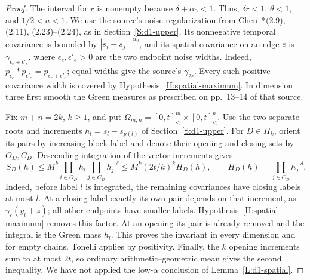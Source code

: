 \documentclass[12pt]{article}
\numberwithin{equation}{section}
\theoremstyle{definition}
\begin{document}
\begin{proof}
  The interval for $r$ is nonempty because $\delta+\alpha_0<1$.
  Thus, $\delta r<1$, $\theta<1$, and $1/2<a<1$.
  We use the source's noise regularization from
  Chen~\cite{chen:author2026:time-dependency}*{(2.9), (2.11),
  (2.23)--(2.24)}, as in Section~\ref{S:d1-upper}. Its nonnegative
  temporal covariance is bounded by $|s_i-s_j|^{-\alpha_0}$, and its
  spatial covariance on an edge $e$ is
  $\gamma_{\epsilon_e+\epsilon'_e}$, where $\epsilon_e,\epsilon'_e>0$
  are the two endpoint noise widths. Indeed,
  $p_{\epsilon_e}*p_{\epsilon'_e}=p_{\epsilon_e+\epsilon'_e}$;
  equal widths give the source's $\gamma_{2\epsilon}$.
  Every such positive covariance width is covered by
  Hypothesis~\ref{H:spatial-maximum}. In dimension three first smooth
  the Green measures as prescribed on pp.~13--14 of that source.

  Fix $m+n=2k$, $k\ge1$, and put
  $\Omega_{m,n}=[0,t]^m_<\times[0,t]^n_<$.
  Use the two separate roots and increments $h_l=s_l-s_{p(l)}$ of
  Section~\ref{S:d1-upper}. For $D\in\Pi_k$, orient its pairs by
  increasing block label and denote their opening and closing sets by
  $O_D,C_D$. Descending integration of the vector increments gives
  \[
    S_D(h)\le M^k\prod_{i\in O_D}h_i\prod_{j\in C_D}h_j^{-\delta}
    \le M^k(2t/k)^k H_D(h),\qquad
    H_D(h)=\prod_{j\in C_D}h_j^{-\delta}.
  \]
  Indeed, before label $l$ is integrated, the remaining covariances have
  closing labels at most $l$. At a closing label exactly its own pair
  depends on that increment, as $\gamma_\epsilon(y_l+z)$; all other
  endpoints have smaller labels. Hypothesis~\ref{H:spatial-maximum}
  removes this factor. At an opening its pair is already removed and
  the integral is the Green mass $h_l$. This proves the invariant in
  every dimension and for empty chains. Tonelli applies by positivity.
  Finally, the $k$ opening increments sum to at most $2t$, so ordinary
  arithmetic--geometric mean gives the second inequality. We have not
  applied the low-$\alpha$ conclusion of Lemma~\ref{L:d1-spatial}.


\end{proof}
\end{document}
